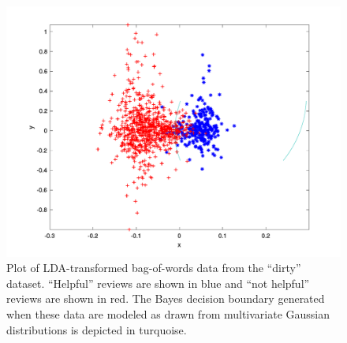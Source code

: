 \begin{figure}[!htbp]
\begin{center}
\includegraphics[width=\textwidth]{img/clean_boundary.pdf}
\caption{
Plot of LDA-transformed bag-of-words data from the ``dirty'' dataset.
``Helpful'' reviews are shown in blue and ``not helpful'' reviews are shown in red.
The Bayes decision boundary generated when these data are modeled as drawn from multivariate Gaussian distributions is depicted in turquoise.
}
\label{fig:clean_boundary}
\end{center}
\end{figure}
